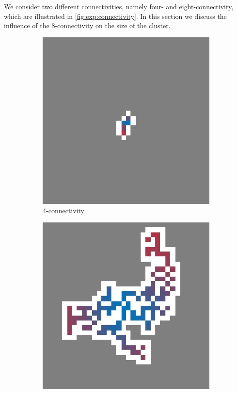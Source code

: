 We consider two different connectivities, namely four- and eight-connectivity, which are illustrated in \cref{fig:exp:connectivity}. In this section we discuss the influence of the 8-connectivity on the size of the cluster.

\begin{figure}
	\centering
	\begin{subfigure}{0.45\columnwidth}
		\centering
		\includegraphics[width=\textwidth]{img/assignment_connectivity_four_N80_p3.jpeg}
		\caption{4-connectivity}
		\label{fig:exp:connectivity:fourConnect}
	\end{subfigure}
	\begin{subfigure}{0.45\columnwidth}
		\centering
		\includegraphics[width=\textwidth]{img/assignment_connectivity_eight_N80_p3.jpeg}

\end{subfigure}
\end{figure}
